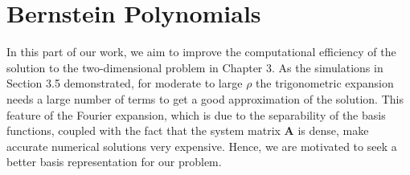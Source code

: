 \section{Bernstein Polynomials} \label{section:bernstein-polynomials}
In this part of our work, we aim to improve the computational efficiency of the solution to the two-dimensional problem in Chapter 3. As the simulations in Section 3.5 demonstrated, for moderate to large $\rho$ the trigonometric expansion needs a large number of terms to get a good approximation of the solution. This feature of the Fourier expansion, which is due to the separability of the basis functions, coupled with the fact that the system matrix $\mathbf{A}$ is dense, make accurate numerical solutions very expensive. Hence, we are motivated to seek a better basis representation for our problem.


